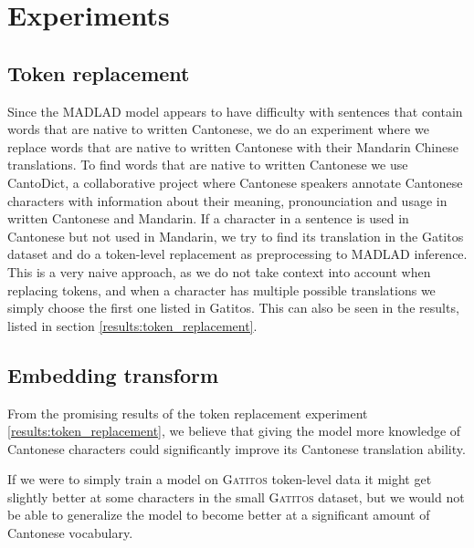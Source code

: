\section{Experiments}
\subsection{Token replacement}
Since the MADLAD model appears to have difficulty with sentences that contain words that are native to written Cantonese, we do an experiment where we replace words that are native to written Cantonese with their Mandarin Chinese translations. To find words that are native to written Cantonese we use CantoDict\cite{cantodict}, a collaborative project where Cantonese speakers annotate Cantonese characters with information about their meaning, pronounciation and usage in written Cantonese and Mandarin. If a character in a sentence is used in Cantonese but not used in Mandarin, we try to find its translation in the Gatitos dataset and do a token-level replacement as preprocessing to MADLAD inference. This is a very naive approach, as we do not take context into account when replacing tokens, and when a character has multiple possible translations we simply choose the first one listed in Gatitos. This can also be seen in the results, listed in section \ref{results:token_replacement}.




\subsection{Embedding transform}
From the promising results of the token replacement experiment \ref{results:token_replacement}, we believe that giving the model more knowledge of Cantonese characters could significantly improve its Cantonese translation ability.

If we were to simply train a model on \textsc{Gatitos} token-level data it might get slightly better at some characters in the small \textsc{Gatitos} dataset, but we would not be able to generalize the model to become better at a significant amount of Cantonese vocabulary.


